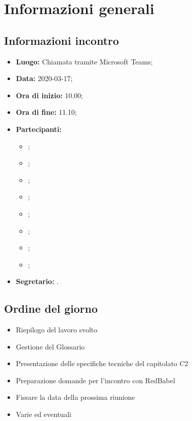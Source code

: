 \section{Informazioni generali}
\subsection{Informazioni incontro}
\begin{itemize}
	\item \textbf{Luogo:} Chiamata tramite Microsoft Teams; 
	\item \textbf{Data:} 2020-03-17;
	\item \textbf{Ora di inizio:} 10.00; 
	\item \textbf{Ora di fine:} 11.10; 
	\item \textbf{Partecipanti:}
		\begin{itemize}
			\item \VB; 
			\item \LB; 
			\item \NF; 
			\item \EG; 
			\item \FJ; 
			\item \MP; 
			\item \AS; 
			\item \AZ; 
		\end{itemize}
	\item \textbf{Segretario:} \LB. 
\end{itemize}

\subsection{Ordine del giorno}
\begin{itemize}
	\item Riepilogo del lavoro svolto 
	\item Gestione del Glossario
	\item Presentazione delle specifiche tecniche del capitolato C2
	\item Preparazione domande per l'incontro con RedBabel
	\item Fissare la data della prossima riunione
	\item Varie ed eventuali
\end{itemize}
